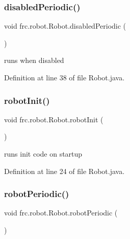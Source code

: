 \mbox{\label{classfrc_1_1robot_1_1Robot_a2bc1b0ce100e4783ba3d549e6ac07ae3}} 
\subsubsection{\texorpdfstring{disabled\+Periodic()}{disabledPeriodic()}}
{\footnotesize\ttfamily void frc.\+robot.\+Robot.\+disabled\+Periodic (\begin{DoxyParamCaption}{ }\end{DoxyParamCaption})}

runs when disabled 

Definition at line 38 of file Robot.\+java.

\mbox{\label{classfrc_1_1robot_1_1Robot_a1d28582cf3dc31568c3581f631c92f13}} 
\subsubsection{\texorpdfstring{robot\+Init()}{robotInit()}}
{\footnotesize\ttfamily void frc.\+robot.\+Robot.\+robot\+Init (\begin{DoxyParamCaption}{ }\end{DoxyParamCaption})}

runs init code on startup 

Definition at line 24 of file Robot.\+java.

\mbox{\label{classfrc_1_1robot_1_1Robot_a7e63e32ebe8ad3d33bbc3b09092a9f1f}} 
\subsubsection{\texorpdfstring{robot\+Periodic()}{robotPeriodic()}}
{\footnotesize\ttfamily void frc.\+robot.\+Robot.\+robot\+Periodic (\begin{DoxyParamCaption}{ }\end{DoxyParamCaption})}

